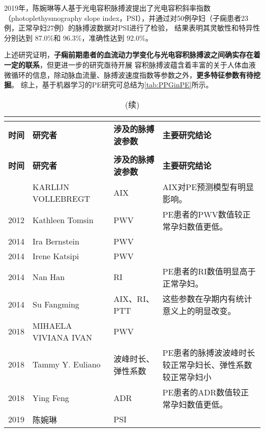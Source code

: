 2019年，陈婉琳等人\cite{Chen2019}基于光电容积脉搏波提出了光电容积斜率指数（photoplethysmography slope index，PSI），并通过对50例孕妇（子痫患者23例，正常孕妇27例）的脉搏波数据对PSI进行了检验，
结果表明其灵敏性和特异性分别达到 87.0\%和 96.3\%，准确性达到 92.0\%。

上述研究证明，\textbf{子痫前期患者的血流动力学变化与光电容积脉搏波之间确实存在着一定的联系}，但更进一步的研究亟待开展
容积脉搏波蕴含着丰富的关于人体血液微循环的信息，除动脉血流量、脉搏波速度指数等参数之外，\textbf{更多特征参数有待挖掘}。
综上，基于机器学习的PE研究可总结为\autoref{tab:PPGinPE}所示。

\begin{center}
	\begin{longtable}{m{1cm}<{\centering}m{3cm}<{\centering}m{3cm}<{\centering}m{7cm}<{\centering}}
		\caption{基于脉搏波的PE研究小结}\\
		\label{tab:PPGinPE}\\
        \toprule
        \textbf{时间}&\textbf{研究者}&\textbf{涉及的脉搏波参数}&\textbf{主要研究结论}\\
        \midrule
        \endfirsthead
        \caption[]{(续)}\\
        \midrule
        \textbf{时间}&\textbf{研究者}&\textbf{涉及的脉搏波参数}&\textbf{主要研究结论}\\
        \midrule
        \endhead 
        \midrule
        \endfoot
        \bottomrule
        \endlastfoot
        2008    &   KARLIJN VOLLEBREGT\cite{KARLIJN2008}    &   AIX     &   AIX对PE预测模型有明显影响。\\
        2012    &   Kathleen Tomsin\cite{Tomsin2012}    &   PWV     &   PE患者的PWV数值较正常孕妇数值更低。 \\
        2014    &   Ira Bernstein\cite{Ira2014}     &   PWV &   \\
        2014    &   Irene Katsipi\cite{Katsipi2014}     &   PWV &   \\
        2014    &   Nan Han\cite{Han2014}     &   RI &  PE患者的RI数值明显高于正常孕妇。 \\
        2014    &   Su Fangming\cite{Su2014}    &   AIX、RI、PTT    &   这些参数在孕期内有统计意义上的明显改变。\\
        2018    &   MIHAELA VIVIANA IVAN\cite{VivianaIvan2018}     &   PWV &   \\
        2018    &   Tammy Y. Euliano\cite{Euliano2018}     &   波峰时长、弹性系数 &   PE患者的脉搏波波峰时长较正常孕妇长、弹性系数较正常孕妇小\\
        2018    &   Ying Feng\cite{Feng2018}    &   ADR &  PE患者的ADR数值较正常孕妇数值更低。 \\
        2019    &   陈婉琳\cite{Chen2019}     &   PSI &   \\
	\end{longtable}
\end{center}

